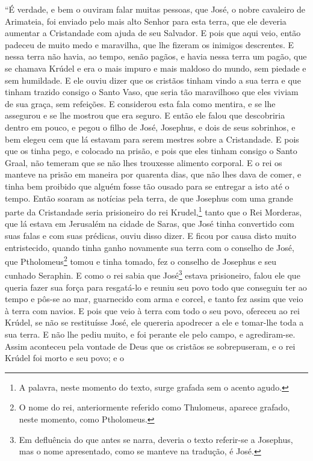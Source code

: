 “É verdade, e bem o ouviram falar muitas pessoas, que José, o nobre
cavaleiro de Arimateia, foi enviado pelo mais alto Senhor para esta terra, que
ele deveria aumentar a Cristandade com ajuda de seu Salvador. E pois que aqui
veio, então padeceu de muito medo e maravilha, que lhe fizeram os inimigos
descrentes. E nessa terra não havia, ao tempo, senão pagãos, e havia nessa
terra um pagão, que se chamava Krúdel e era o mais impuro e mais maldoso do
mundo, sem piedade e sem humildade. E ele ouviu dizer que os cristãos
tinham vindo a sua terra e que tinham trazido consigo o Santo Vaso, que seria
tão maravilhoso que eles viviam de sua graça, sem refeições. E considerou esta
fala como mentira, e se lhe assegurou e se lhe mostrou que era seguro. E então
ele falou que descobriria dentro em pouco, e pegou o filho de José, Josephus, e
dois de seus sobrinhos, e bem elegeu cem que lá estavam para serem mestres
sobre a Cristandade. E pois que os tinha pego, e colocado na prisão, e pois que
eles tinham consigo o Santo Graal, não temeram que se não lhes trouxesse
alimento corporal. E o rei os manteve na prisão em maneira por quarenta dias,
que não lhes dava de comer, e tinha bem proibido que alguém fosse tão ousado
para se entregar a isto até o tempo. Então soaram as notícias pela terra, de
que Josephus com uma grande parte da Cristandade seria prisioneiro do rei
Krudel,\footnote{ A palavra, neste momento do texto, surge grafada sem o acento
agudo.}  tanto que o Rei Morderas,  que lá estava em Jerusalém na
cidade de Saras, que José tinha convertido com suas falas e com suas prédicas,
ouviu disso dizer. E ficou por causa disto muito entristecido, quando tinha
ganho novamente sua terra com o conselho de José, que Ptholomeus\footnote{ O
nome do rei, anteriormente referido como Thulomeus, aparece grafado, neste
momento, como Ptholomeus.}  tomou e tinha tomado, fez o conselho de
Josephus e seu cunhado Seraphin. E como o rei sabia que José\footnote{ Em
defluência do que antes se narra, deveria o texto referir-se a Josephus, mas o
nome apresentado, como se manteve na tradução, é José.}  estava
prisioneiro, falou ele que queria fazer sua força para resgatá-lo e reuniu seu
povo todo que conseguiu ter ao tempo e pôs-se ao mar, guarnecido com arma e
corcel, e tanto fez assim que veio à terra com navios. E pois que veio à terra
com todo o seu povo, ofereceu ao rei Krúdel, se não se restituísse José, ele
quereria apodrecer a ele e tomar-lhe toda a sua terra. E não lhe pediu muito, e
foi perante ele pelo campo, e agrediram-se. Assim aconteceu pela vontade de
Deus que os cristãos se sobrepuseram, e o rei Krúdel foi morto e seu povo; e o
